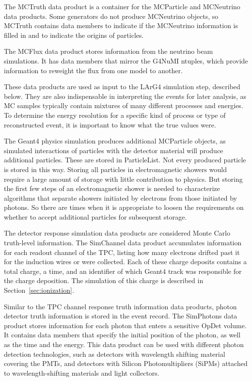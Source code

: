\documentclass[12pt]{elsarticle}
\begin{document}
The MCTruth data product is a container for the MCParticle and MCNeutrino
data products.  Some generators do not produce MCNeutrino objects, so MCTruth contains data members to indicate if the MCNeutrino information is filled in and to indicate the origins of particles.
 
The MCFlux data product stores information from the neutrino beam simulations. It has data members that mirror the G4NuMI ntuples, which provide information to reweight the flux from one model to another.

These data products are used as input to the LArG4 simulation step, described below. They are also indispensable in interpreting the events for later analysis, as MC samples typically contain mixtures of many different processes and energies. To determine the energy resolution for a specific kind of process or type of reconstructed event, it is important to know what the true values were.

The Geant4 physics simulation produces additional MCParticle objects, as simulated interactions
of particles with the detector material will produce additional particles.  These are stored in ParticleList.  Not every produced particle is stored in this way. Storing all 
particles in electromagnetic showers would require a large amount of storage with little contribution to physics. 
But storing the first few steps of an electromagnetic shower
is needed to characterize algorithms that separate showers initiated by electrons from those initiated by photons. So there are times when it is appropriate to loosen
the requirements on whether to accept additional particles for subsequent storage.

The detector response simulation data products are considered Monte Carlo truth-level information. The SimChannel data product accumulates information for each readout channel of the TPC, listing how many electrons drifted past it for the induction wires or were collected. Each of these charge deposits contains a total charge, a time, and an identifier of which Geant4 track was responsible for the charge deposition. The simulation of this charge is described in 
Section~\ref{sec:ionization}.

Similar to the TPC channel response truth information data products, photon detector truth information
is stored in the event record.  The SimPhotons data product stores information for each photon
that enters a sensitive OpDet volume.  It contains data members that specify the initial position of the
photon, as well as the time and the energy.    
This data product can be used with different photon detection technologies, such as detectors with wavelength shifting material covering the PMTs, and detectors with Silicon Photomultipliers (SiPMs) attached to wavelength-shifting materials and light collectors.
\end{document}
